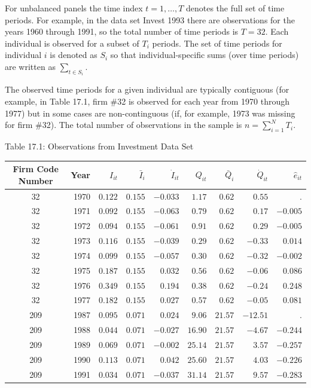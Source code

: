 \documentclass[10pt]{article}
\begin{document}
For unbalanced panels the time index $t=1, \ldots, T$ denotes the full set of time periods. For example, in the data set Invest 1993 there are observations for the years 1960 through 1991, so the total number of time periods is $T=32$. Each individual is observed for a subset of $T_{i}$ periods. The set of time periods for individual $i$ is denoted as $S_{i}$ so that individual-specific sums (over time periods) are written as $\sum_{t \in S_{i}}$.

The observed time periods for a given individual are typically contiguous (for example, in Table 17.1, firm \#32 is observed for each year from 1970 through 1977) but in some cases are non-continguous (if, for example, 1973 was missing for firm \#32). The total number of observations in the sample is $n=\sum_{i=1}^{N} T_{i}$.

Table 17.1: Observations from Investment Data Set

\begin{tabular}{crrrrrrrr}
\hline\hline
Firm Code Number & Year & $I_{i t}$ & $\bar{I}_{i}$ & $\dot{I}_{i t}$ & $Q_{i t}$ & $\bar{Q}_{i}$ & $\dot{Q}_{i t}$ & $\widehat{e}_{i t}$ \\
\hline
32 & 1970 & $0.122$ & $0.155$ & $-0.033$ & $1.17$ & $0.62$ & $0.55$ & . \\
32 & 1971 & $0.092$ & $0.155$ & $-0.063$ & $0.79$ & $0.62$ & $0.17$ & $-0.005$ \\
32 & 1972 & $0.094$ & $0.155$ & $-0.061$ & $0.91$ & $0.62$ & $0.29$ & $-0.005$ \\
32 & 1973 & $0.116$ & $0.155$ & $-0.039$ & $0.29$ & $0.62$ & $-0.33$ & $0.014$ \\
32 & 1974 & $0.099$ & $0.155$ & $-0.057$ & $0.30$ & $0.62$ & $-0.32$ & $-0.002$ \\
32 & 1975 & $0.187$ & $0.155$ & $0.032$ & $0.56$ & $0.62$ & $-0.06$ & $0.086$ \\
32 & 1976 & $0.349$ & $0.155$ & $0.194$ & $0.38$ & $0.62$ & $-0.24$ & $0.248$ \\
32 & 1977 & $0.182$ & $0.155$ & $0.027$ & $0.57$ & $0.62$ & $-0.05$ & $0.081$ \\
209 & 1987 & $0.095$ & $0.071$ & $0.024$ & $9.06$ & $21.57$ & $-12.51$ & . \\
209 & 1988 & $0.044$ & $0.071$ & $-0.027$ & $16.90$ & $21.57$ & $-4.67$ & $-0.244$ \\
209 & 1989 & $0.069$ & $0.071$ & $-0.002$ & $25.14$ & $21.57$ & $3.57$ & $-0.257$ \\
209 & 1990 & $0.113$ & $0.071$ & $0.042$ & $25.60$ & $21.57$ & $4.03$ & $-0.226$ \\
209 & 1991 & $0.034$ & $0.071$ & $-0.037$ & $31.14$ & $21.57$ & $9.57$ & $-0.283$ \\
\hline
\end{tabular}
\end{document}
